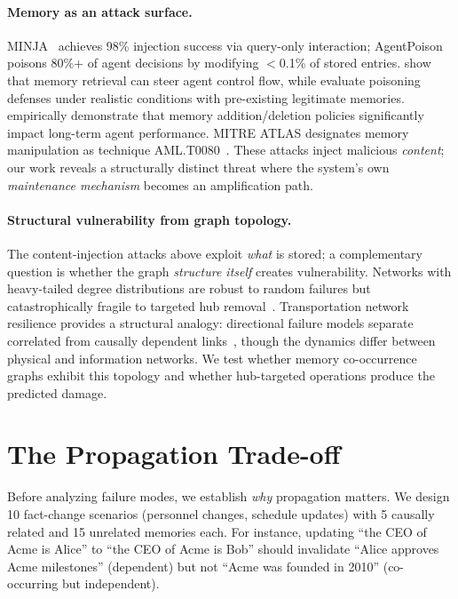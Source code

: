 \documentclass{article}
\begin{document}
\paragraph{Memory as an attack surface.}
MINJA~\citep{minja_2025} achieves 98\% injection success via query-only interaction; AgentPoison~\citep{agentpoison_2024} poisons 80\%+ of agent decisions by modifying $<$0.1\% of stored entries.
\citet{xu_mcfa_2026} show that memory retrieval can steer agent control flow, while \citet{devarangadi_poisoning_2026} evaluate poisoning defenses under realistic conditions with pre-existing legitimate memories.
\citet{xiong_memory_mgmt_2025} empirically demonstrate that memory addition/deletion policies significantly impact long-term agent performance.
MITRE ATLAS designates memory manipulation as technique AML.T0080~\citep{mitre_atlas_2023}.
These attacks inject malicious \textit{content}; our work reveals a structurally distinct threat where the system's own \textit{maintenance mechanism} becomes an amplification path.

\paragraph{Structural vulnerability from graph topology.}
The content-injection attacks above exploit \textit{what} is stored; a complementary question is whether the graph \textit{structure itself} creates vulnerability.
Networks with heavy-tailed degree distributions are robust to random failures but catastrophically fragile to targeted hub removal~\citep{albert_attack_2000, cohen_percolation_2000}.
Transportation network resilience provides a structural analogy: directional failure models separate correlated from causally dependent links~\citep{chen_network_2007}, though the dynamics differ between physical and information networks.
We test whether memory co-occurrence graphs exhibit this topology and whether hub-targeted operations produce the predicted damage.


\section{The Propagation Trade-off}
\label{sec:tradeoff}

Before analyzing failure modes, we establish \textit{why} propagation matters.
We design 10 fact-change scenarios (personnel changes, schedule updates) with 5 causally related and 15 unrelated memories each.
For instance, updating ``the CEO of Acme is Alice'' to ``the CEO of Acme is Bob'' should invalidate ``Alice approves Acme milestones'' (dependent) but not ``Acme was founded in 2010'' (co-occurring but independent).
\end{document}
